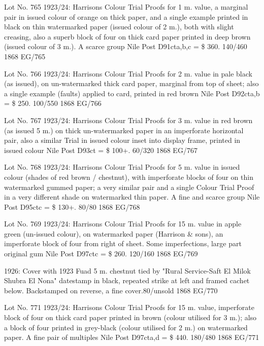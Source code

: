 \documentclass[justified]{tufte-book}
\begin{document}
%
{Lot No. 765
1923/24: Harrisons Colour Trial Proofs for 1 m. value, a marginal pair in issued colour of orange on thick paper, and a single example printed in black on thin watermarked paper (issued colour of 2 m.), both with slight creasing, also a superb block of four on thick card paper printed in deep brown (issued colour of 3 m.). A scarce group Nile Post D91cta,b,c = \$ 360. 140/460  
}%
{1868}%
{EG/765}%
{}%
{}
{}%
{}

%
{Lot No. 766
1923/24: Harrisons Colour Trial Proofs for 2 m. value in pale black (as issued), on un-watermarked thick card paper, marginal from top of sheet; also a single example (faults) applied to card, printed in red brown Nile Post D92cta,b = \$ 250. 100/550 
}%
{1868}%
{EG/766}%
{}%
{}
{}%
{}

%
{
Lot No. 767
1923/24: Harrisons Colour Trial Proofs for 3 m. value in red brown (as issued 5 m.) on thick un-watermarked paper in an imperforate horizontal pair, also a similar Trial in issued colour inset into display frame, printed in issued colour Nile Post D93ct = \$ 100+. 60/320
}%
{1868}%
{EG/767}%
{}%
{}
{}%
{}

%
{Lot No. 768
1923/24: Harrisons Colour Trial Proofs for 5 m. value in issued colour (shades of red brown / chestnut), with imperforate blocks of four on thin watermarked gummed paper; a very similar pair and a single Colour Trial Proof in a very different shade on watermarked thin paper. A fine and scarce group Nile Post D95ctc = \$ 130+. 80/80 
}%
{1868}%
{EG/768}%
{}%
{}
{}%
{}

%
{
Lot No. 769
1923/24: Harrisons Colour Trial Proofs for 15 m. value in apple green (un-issued colour), on watermarked paper (Harrison \& sons), an imperforate block of four from right of sheet. Some imperfections, large part original gum Nile Post D97ctc = \$ 260. 120/160
}%
{1868}%
{EG/769}%
{}%
{}
{}%
{}


%
{ 1926: Cover with 1923 Fuad 5 m. chestnut tied by "Rural Service-Saft El Milok Shubra El Nona" datestamp in black, repeated strike at left and framed cachet below. Backstamped on reverse, a fine cover.80/unsold
}%
{1868}%
{EG/770}%
{}%
{}
{}%
{}

%
{Lot No. 771
1923/24: Harrisons Colour Trial Proofs for 15 m. value, imperforate block of four on thick card paper printed in brown (colour utilised for 3 m.); also a block of four printed in grey-black (colour utilised for 2 m.) on watermarked paper. A fine pair of multiples Nile Post D97cta,d = \$ 440. 180/480
}%
{1868}%
{EG/771}%
{}%
{}
{}%
{}
\end{document}
